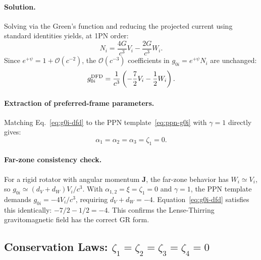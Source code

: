\paragraph{Solution.}
Solving via the Green's function and reducing the projected current using standard identities yields, at 1PN order:
\begin{equation}\label{eq:N-solution}
N_i = \frac{4G}{c^3}V_i - \frac{2G}{c^3}W_i.
\end{equation}
Since $e^{+\psi} = 1 + \mathcal{O}(c^{-2})$, the $\mathcal{O}(c^{-3})$ coefficients in $g_{0i} = e^{+\psi}N_i$ are unchanged:
\begin{equation}\label{eq:g0i-dfd}
g_{0i}^{\rm DFD} = \frac{1}{c^3}\left(-\frac{7}{2}V_i - \frac{1}{2}W_i\right).
\end{equation}

\paragraph{Extraction of preferred-frame parameters.}
Matching Eq.~\eqref{eq:g0i-dfd} to the PPN template~\eqref{eq:ppn-g0i} with $\gamma = 1$ directly gives:
\begin{equation}\label{eq:alphas-zero}
\boxed{\alpha_1 = \alpha_2 = \alpha_3 = \zeta_1 = 0}.
\end{equation}

\paragraph{Far-zone consistency check.}
For a rigid rotator with angular momentum $\mathbf{J}$, the far-zone behavior has $W_i \simeq V_i$, so $g_{0i} \simeq (d_V + d_W)V_i/c^3$. With $\alpha_{1,2} = \xi = \zeta_1 = 0$ and $\gamma = 1$, the PPN template demands $g_{0i} = -4V_i/c^3$, requiring $d_V + d_W = -4$. Equation~\eqref{eq:g0i-dfd} satisfies this identically: $-7/2 - 1/2 = -4$. This confirms the Lense-Thirring gravitomagnetic field has the correct GR form.

\subsection{Conservation Laws: \texorpdfstring{$\zeta_1 = \zeta_2 = \zeta_3 = \zeta_4 = 0$}{zetas = 0}}\label{sec:ppn-conservation}


